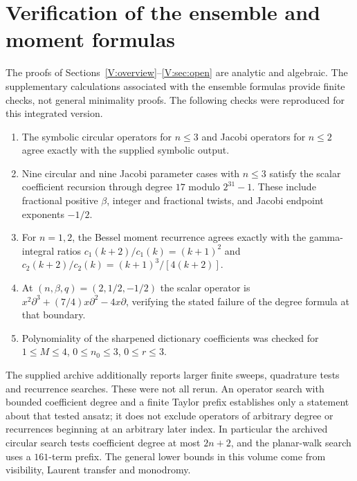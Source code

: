 \documentclass[11pt,a4paper]{article}
\theoremstyle{definition}
\theoremstyle{remark}
\numberwithin{equation}{section}
\begin{document}
\section{Verification of the ensemble and moment formulas}\label{V:app:comp}
The proofs of Sections~\ref{V:overview}--\ref{V:sec:open} are analytic
and algebraic. The supplementary calculations associated with the
ensemble formulas provide finite checks, not general minimality proofs.
The following checks were reproduced for this integrated version.
\begin{enumerate}[leftmargin=*]
\item The symbolic circular operators for $n\le3$ and Jacobi operators
for $n\le2$ agree exactly with the supplied symbolic output.
\item Nine circular and nine Jacobi parameter cases with $n\le3$
satisfy the scalar coefficient recursion through degree $17$ modulo
$2^{31}-1$. These include fractional positive $\beta$, integer and
fractional twists, and Jacobi endpoint exponents $-1/2$.
\item For $n=1,2$, the Bessel moment recurrence agrees exactly with
the gamma-integral ratios
$c_1(k+2)/c_1(k)=(k+1)^2$ and
$c_2(k+2)/c_2(k)=(k+1)^3/[4(k+2)]$.
\item At $(n,\beta,q)=(2,1/2,-1/2)$ the scalar operator is
$x^2\partial^3+(7/4)x\partial^2-4x\partial$, verifying the stated
failure of the degree formula at that boundary.
\item Polynomiality of the sharpened dictionary coefficients was
checked for $1\le M\le4$, $0\le n_0\le3$, $0\le r\le3$.
\end{enumerate}
The supplied archive additionally reports larger finite sweeps,
quadrature tests and recurrence searches. These were not all rerun.
An operator search with bounded coefficient degree and a finite
Taylor prefix establishes only a statement about that tested ansatz;
it does not exclude operators of arbitrary degree or recurrences
beginning at an arbitrary later index. In particular the archived
circular search tests coefficient degree at most $2n+2$, and the
planar-walk search uses a $161$-term prefix. The general lower bounds
in this volume come from visibility, Laurent transfer and monodromy.
\end{document}
